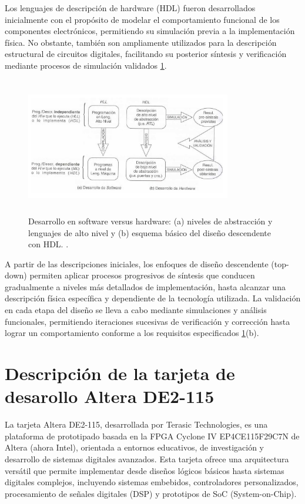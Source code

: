 Los lenguajes de descripción de hardware (HDL) fueron desarrollados inicialmente con el propósito de modelar el comportamiento funcional de los componentes electrónicos, permitiendo su simulación previa a la implementación física. No obstante, también son ampliamente utilizados para la descripción estructural de circuitos digitales, facilitando su posterior síntesis y verificación mediante procesos de simulación validados \ref{fig:imagen2}.
\begin{figure}[h!] %
    \centering %
     \includegraphics[width=0.8\textwidth, height=6cm]{imagenes/img2} %
    \caption{Desarrollo en software versus hardware: (a) niveles de abstracción y lenguajes de alto nivel y (b) esquema básico del diseño descendente con HDL.  .}
    \label{fig:imagen2} %
\end{figure} 

A partir de las descripciones iniciales, los enfoques de diseño descendente (top-down) permiten aplicar procesos progresivos de síntesis que conducen gradualmente a niveles más detallados de implementación, hasta alcanzar una descripción física específica y dependiente de la tecnología utilizada. La validación en cada etapa del diseño se lleva a cabo mediante simulaciones y análisis funcionales, permitiendo iteraciones sucesivas de verificación y corrección hasta lograr un comportamiento conforme a los requisitos especificados \ref{fig:imagen2}(b).


\section{Descripción de la tarjeta de desarollo Altera DE2-115 }

La tarjeta Altera DE2-115, desarrollada por Terasic Technologies, es una plataforma de prototipado basada en la FPGA Cyclone IV EP4CE115F29C7N de Altera (ahora Intel), orientada a entornos educativos, de investigación y desarrollo de sistemas digitales avanzados. Esta tarjeta ofrece una arquitectura versátil que permite implementar desde diseños lógicos básicos hasta sistemas digitales complejos, incluyendo sistemas embebidos, controladores personalizados, procesamiento de señales digitales (DSP) y prototipos de SoC (System-on-Chip).


